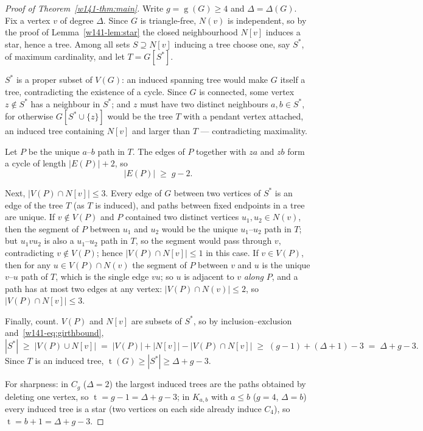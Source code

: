 \documentclass[11pt]{article}
\numberwithin{equation}{section}
\theoremstyle{remark}
\newcommand{\tr}{\operatorname{t}}
\newcommand{\gr}{\operatorname{g}}
\begin{document}
\begin{proof}[Proof of Theorem~\ref{w141-thm:main}]
Write $g=\gr(G)\ge4$ and $\Delta=\Delta(G)$.  Fix a vertex $v$ of degree
$\Delta$.  Since $G$ is triangle-free, $N(v)$ is independent, so by the proof
of Lemma~\ref{w141-lem:star} the closed neighbourhood $N[v]$ induces a star, hence
a tree.  Among all sets $S\supseteq N[v]$ inducing a tree choose one, say
$S^*$, of maximum cardinality, and let $T=G[S^*]$.

$S^*$ is a proper subset of $V(G)$: an induced spanning tree would make $G$
itself a tree, contradicting the existence of a cycle.  Since $G$ is
connected, some vertex $z\notin S^*$ has a neighbour in $S^*$; and $z$ must
have two distinct neighbours $a,b\in S^*$, for otherwise $G[S^*\cup\{z\}]$
would be the tree $T$ with a pendant vertex attached, an induced tree
containing $N[v]$ and larger than $T$ --- contradicting maximality.

Let $P$ be the unique $a$--$b$ path in $T$.  The edges of $P$ together with
$za$ and $zb$ form a cycle of length $|E(P)|+2$, so
\begin{equation}\label{w141-eq:girthbound}
  |E(P)|\;\ge\;g-2 .
\end{equation}

Next, $|V(P)\cap N[v]|\le 3$.  Every edge of $G$ between two vertices of
$S^*$ is an edge of the tree $T$ (as $T$ is induced), and paths between fixed
endpoints in a tree are unique.  If $v\notin V(P)$ and $P$ contained two
distinct vertices $u_1,u_2\in N(v)$, then the segment of $P$ between $u_1$
and $u_2$ would be the unique $u_1$--$u_2$ path in $T$; but $u_1vu_2$ is also
a $u_1$--$u_2$ path in $T$, so the segment would pass through $v$,
contradicting $v\notin V(P)$; hence $|V(P)\cap N[v]|\le1$ in this case.  If
$v\in V(P)$, then for any $u\in V(P)\cap N(v)$ the segment of $P$ between $v$
and $u$ is the unique $v$--$u$ path of $T$, which is the single edge $vu$;
so $u$ is adjacent to $v$ \emph{along} $P$, and a path has at most two edges
at any vertex: $|V(P)\cap N(v)|\le2$, so $|V(P)\cap N[v]|\le3$.

Finally, count.  $V(P)$ and $N[v]$ are subsets of $S^*$, so by
inclusion--exclusion and~\eqref{w141-eq:girthbound},
\[
  |S^*|\;\ge\;|V(P)\cup N[v]|\;=\;|V(P)|+|N[v]|-|V(P)\cap N[v]|
  \;\ge\;(g-1)+(\Delta+1)-3\;=\;\Delta+g-3 .
\]
Since $T$ is an induced tree, $\tr(G)\ge|S^*|\ge\Delta+g-3$.

For sharpness: in $C_g$ ($\Delta=2$) the largest induced trees are the paths
obtained by deleting one vertex, so $\tr=g-1=\Delta+g-3$; in $K_{a,b}$ with
$a\le b$ ($g=4$, $\Delta=b$) every induced tree is a star (two vertices on
each side already induce $C_4$), so $\tr=b+1=\Delta+g-3$.
\end{proof}
\end{document}
